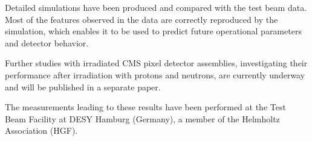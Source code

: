 \documentclass[a4paper,11pt]{article}
\newcommand{\margtodo}
           {\marginpar{\textbf{\textcolor{red}{ToDo}}}{}}
\newcommand{\todo}[1]
           {{\textbf{\textcolor{red}{(\margtodo{}#1)}}}{}}
\begin{document}
Detailed simulations have been produced and compared with the test beam data.
Most of the features observed in the data are correctly reproduced by the simulation, which enables it to be used to predict future operational parameters and detector behavior.

Further studies with irradiated CMS pixel detector assemblies, investigating their performance after irradiation with protons and neutrons, are currently underway and will be published in a separate paper.
\acknowledgments

The measurements leading to these results have been performed at the Test Beam Facility at DESY Hamburg (Germany), a member of the Helmholtz Association (HGF).





\end{document}
